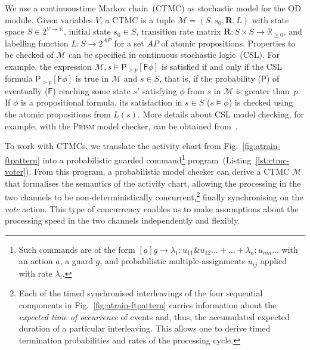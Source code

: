 \documentclass[runningheads,a4paper]{llncs}
\begin{document}
We use a continuous{\Hyphdash}time Markov chain~(CTMC) as stochastic
model for the OD module.  Given variables $V$, a CTMC is a tuple
$\mathcal{M} = (S,s_0,\mathbf{R},L)$ with state space
$S\in 2^{V\to\mathbb{N}}$, initial state $s_0\in S$, transition rate matrix
$\mathbf{R}\colon S\times S\to\mathbb{R}_{\geq 0}$, and labelling
function $L\colon S\to 2^{\mathit{AP}}$ for a set $\mathit{AP}$ of
atomic propositions.
Properties to be checked of $\mathcal{M}$ can be specified in
continuous stochastic logic~(CSL).  For example, the expression
$\mathcal{M},s \models \mathsf{P}_{>p}[\mathsf{F} \phi]$ is satisfied
if and only if the CSL formula $\mathsf{P}_{>p}[\mathsf{F} \phi]$ is
true in $\mathcal{M}$ and $s\in S$, that is, if the probability
($\mathsf{P}$) of eventually ($\mathsf{F}$) reaching some state $s'$
satisfying $\phi$ from $s$ in $\mathcal{M}$ is greater than~$p$.  If
$\phi$ is a propositional formula, its satisfaction in $s\in S$
($s\models\phi$) is checked using the atomic propositions from $L(s)$.
More details about CSL model checking, for example, with the
\textsc{Prism} model checker, can be obtained
from~\cite{Kwiatkowska2011-PRISM4Verification}.

To work with CTMCs, we translate the activity chart from
Fig.~\ref{fig:atrain-ftpattern} into a probabilistic guarded
command\footnote{Such commands are of the form
  $[a] g\to \lambda_1\colon u_{11}\&u_{12}\dots + \dots + \lambda_{n}\colon
  u_{nm}\dots$ with an action $a$, a guard $g$, and probabilistic
  multiple-assignments $u_{ij}$ applied with rate $\lambda_i$.}
program~(Listing~\ref{lst:ctmc-voter}).  From this program, a
probabilistic model checker can derive a CTMC $\mathcal{M}$ that
formalises the semantics of the activity chart, allowing the
processing in the two channels to be non-deterministically
concurrent,\footnote{
  Each of the timed synchronised interleavings of the four sequential
  components in Fig.~\ref{fig:atrain-ftpattern} carries information
  about the \emph{expected time of occurrence} of events and, thus,
  the accumulated expected duration of a particular interleaving.
  This allows one to derive timed termination probabilities and rates
  of the processing cycle.}  finally synchronising on the \emph{vote}
action.  This type of concurrency enables us to make assumptions about
the processing speed in the two channels independently and flexibly.
\end{document}
